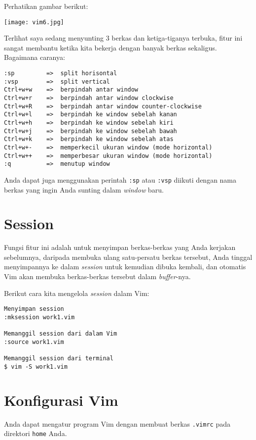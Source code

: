 \documentclass{article}
\begin{document}
Perhatikan gambar berikut:

\vspace{12pt}

\texttt{[image: vim6.jpg]}

\vspace{12pt}

Terlihat saya sedang menyunting 3 berkas dan ketiga-tiganya
terbuka, fitur ini sangat membantu ketika kita bekerja
dengan banyak berkas sekaligus. Bagaimana caranya:

\begin{verbatim}
:sp         =>  split horisontal
:vsp        =>  split vertical
Ctrl+w+w    =>  berpindah antar window
Ctrl+w+r    =>  berpindah antar window clockwise
Ctrl+w+R    =>  berpindah antar window counter-clockwise
Ctrl+w+l    =>  berpindah ke window sebelah kanan
Ctrl+w+h    =>  berpindah ke window sebelah kiri 
Ctrl+w+j    =>  berpindah ke window sebelah bawah 
Ctrl+w+k    =>  berpindah ke window sebelah atas 
Ctrl+w+-    =>  memperkecil ukuran window (mode horizontal)
Ctrl+w++    =>  memperbesar ukuran window (mode horizontal)
:q          =>  menutup window
\end{verbatim}

Anda dapat juga menggunakan perintah \verb=:sp= atau
\verb=:vsp= diikuti dengan nama berkas yang ingin Anda
sunting dalam \emph{window} baru.

\section{Session}
Fungsi fitur ini adalah untuk menyimpan berkas-berkas yang
Anda kerjakan sebelumnya, daripada membuka ulang
satu-persatu berkas tersebut, Anda tinggal menyimpannya ke
dalam \emph{session} untuk kemudian dibuka kembali, dan
otomatis Vim akan membuka berkas-berkas tersebut dalam
\emph{buffer}-nya. 

Berikut cara kita mengelola \emph{session} dalam Vim:

\begin{verbatim}
Menyimpan session
:mksession work1.vim

Memanggil session dari dalam Vim
:source work1.vim

Memanggil session dari terminal
$ vim -S work1.vim
\end{verbatim}


\section{Konfigurasi Vim}
Anda dapat mengatur program Vim dengan membuat berkas
\verb=.vimrc= pada direktori \verb=home= Anda.
\end{document}

